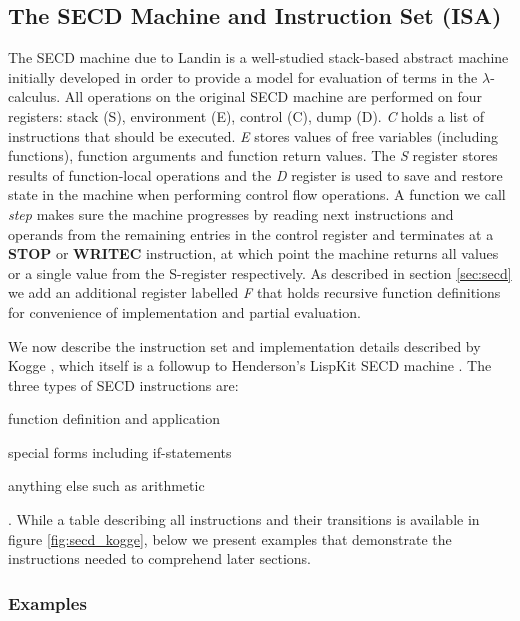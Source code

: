 \documentclass[a4paper,12pt,twoside,openright]{report}
\theoremstyle{definition}
\begin{document}
\subsection{The SECD Machine and Instruction Set (ISA)}\label{subsec:secd}
The SECD machine due to Landin \cite{landin1964mechanical} is a well-studied stack-based abstract machine initially developed in order to provide a model for evaluation of terms in the $\lambda$-calculus. All operations on the original SECD machine are performed on four registers: stack (S), environment (E), control (C), dump (D). \textit{C} holds a list of instructions that should be executed. \textit{E} stores values of free variables (including functions), function arguments and function return values. The \textit{S} register stores results of function-local operations and the \textit{D} register is used to save and restore state in the machine when performing control flow operations. A function we call \textit{step} makes sure the machine progresses by reading next instructions and operands from the remaining entries in the control register and terminates at a \textbf{STOP} or \textbf{WRITEC} instruction, at which point the machine returns all values or a single value from the S-register respectively. As described in section \ref{sec:secd} we add an additional register labelled \textit{F} that holds recursive function definitions for convenience of implementation and partial evaluation.

We now describe the instruction set and implementation details described by Kogge \cite{kogge1990architecture}, which itself is a followup to Henderson's LispKit SECD machine \cite{henderson1980functional}. The three types of SECD instructions are:
\begin{enumerate*}[label=(\arabic*)]
    \item function definition and application
    \item special forms including if-statements
    \item anything else such as arithmetic
\end{enumerate*}. While a table describing all instructions and their transitions is available in figure \ref{fig:secd_kogge}, below we present examples that demonstrate the instructions needed to comprehend later sections.

\subsubsection{Examples}\label{ssubsec:secd_example}
\end{document}

